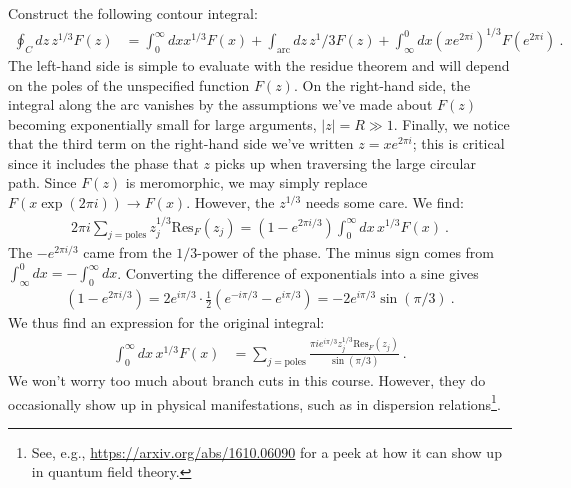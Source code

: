 Construct the following contour integral:
 \begin{align}
 	\oint_C  dz\, z^{1/3} F(z) &= 
 	\int_0^\infty dx x^{1/3}F(x)
 	+ \int_{\text{arc}} dz \, z^1/3 F(z)
 	+ \int_\infty^0 dx \left(x e^{2\pi i}\right)^{1/3} F\left(e^{2\pi i}\right) \ .
 \end{align}
 The left-hand side is simple to evaluate with the residue theorem and will depend on the poles of the unspecified function $F(z)$. On the right-hand side, the integral along the arc vanishes by the assumptions we've made about $F(z)$ becoming exponentially small for large arguments, $|z|=R\gg 1$.  Finally, we notice that the third term on the right-hand side we've written $z=xe^{2\pi i}$; this is critical since it includes the phase that $z$ picks up when traversing the large circular path. Since $F(z)$ is meromorphic, we may simply replace $F(x\exp(2\pi i)) \to F(x)$. However, the $z^{1/3}$ needs some care. We find:
 \begin{align}
 	2\pi i \sum_{j=\text{poles}} z_j^{1/3} \text{Res}_F (z_j)
 	=
 	\left(1-e^{2\pi i/3}\right) \int_0^\infty dx\,  x^{1/3} F(x) \ .
 \end{align}
The $-e^{2\pi i/3}$ came from the $1/3$-power of the phase. The minus sign comes from $\int_{\infty}^0 dx = -\int_0^\infty dx$. Converting the difference of exponentials into a sine gives
\begin{align}
	\left(1-e^{2\pi i/3}\right) 
	= 2e^{i\pi/3} \cdot \frac{1}{2}\left(e^{-i\pi/3}-e^{i\pi/3}\right)
	= -2 e^{i\pi/3} \sin(\pi/3) \ .
\end{align}
We thus find an expression for the original integral:
\begin{align}
	\int_0^\infty dx\, x^{1/3}F(x) &=
	\sum_{j=\text{poles}}
	\frac{\pi i e^{i\pi/3} z_j^{1/3}\text{Res}_F(z_j)}{\sin(\pi/3)}
	\ .
\end{align}
We won't worry too much about branch cuts in this course. However, they do occasionally show up in physical manifestations, such as in dispersion relations\footnote{See, e.g., \url{https://arxiv.org/abs/1610.06090} for a peek at how it can show up in quantum field theory.}.




